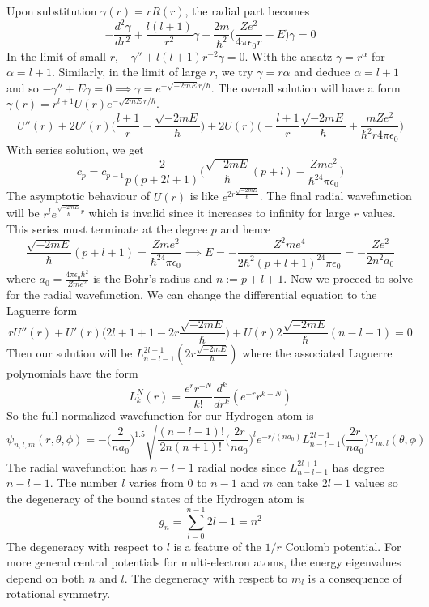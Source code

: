 \documentclass[a4paper]{article}
\begin{document}
\begin{eg}
Upon substitution $\gamma(r)=rR(r)$, the radial part becomes
$$-\frac{d^2\gamma}{dr^2}+\frac{l(l+1)}{r^2}\gamma+\frac{2m}{\hbar^2}\bigg(\frac{Ze^2}{4\pi\epsilon_0r}-E\bigg)\gamma=0$$
In the limit of small $r$, $-\gamma''+l(l+1)r^{-2}\gamma=0$. With the ansatz $\gamma=r^\alpha$ for $\alpha=l+1$. Similarly, in the limit of large $r$, we try $\gamma=r\alpha$ and deduce $\alpha=l+1$ and so $-\gamma''+E\gamma=0\implies\gamma=e^{-\sqrt{-2mE}r/\hbar}$. The overall solution will have a form $\gamma(r)=r^{l+1}U(r)e^{-\sqrt{2mE}r/\hbar}$. 
$$U''(r)+2U'(r)\bigg(\frac{l+1}{r}-\frac{\sqrt{-2mE}}{\hbar}\bigg)+2U(r)\bigg(-\frac{l+1}{r}\frac{\sqrt{-2mE}}{\hbar}+\frac{mZe^2}{\hbar^2r4\pi\epsilon_0}\bigg)$$
With series solution, we get
$$c_p=c_{p-1}\frac{2}{p(p+2l+1)}\bigg(\frac{\sqrt{-2mE}}{\hbar}(p+l)-\frac{Zme^2}{\hbar^24\pi\epsilon_0}\bigg)$$
The asymptotic behaviour of $U(r)$ is like $e^{2r\frac{\sqrt{-2mE}}{\hbar}}$. The final radial wavefunction will be $r^le^{\frac{\sqrt{-2mE}}{\hbar}r}$ which is invalid since it increases to infinity for large $r$ values. This series must terminate at the degree $p$ and hence $$\frac{\sqrt{-2mE}}{\hbar}(p+l+1)=\frac{Zme^2}{\hbar^24\pi\epsilon_0}\implies E=-\frac{Z^2me^4}{2\hbar^2(p+l+1)^24\pi\epsilon_0}=-\frac{Ze^2}{2n^2a_0}$$
where $a_0=\frac{4\pi\epsilon_0\hbar^2}{Zme^2}$ is the Bohr's radius and $n:=p+l+1$.
Now we proceed to solve for the radial wavefunction. We can change the differential equation to the Laguerre form
$$rU''(r)+U'(r)\bigg(2l+1+1-2r\frac{\sqrt{-2mE}}{\hbar}\bigg)+U(r)2\frac{\sqrt{-2mE}}{\hbar}(n-l-1)=0$$ Then our solution will be $L_{n-l-1}^{2l+1}(2r\frac{\sqrt{-2mE}}{\hbar})$ where the associated Laguerre polynomials have the form
$$L_k^N(r)=\frac{e^rr^{-N}}{k!}\frac{d^k}{dr^k}(e^{-r}r^{k+N})$$
So the full normalized wavefunction for our Hydrogen atom is
$$\psi_{n,l,m}(r,\theta,\phi)
=-\bigg(\frac{2}{na_0}\bigg)^{1.5}\sqrt{\frac{(n-l-1)!}{2n(n+1)!}}\bigg(\frac{2r}{na_0}\bigg)^le^{-r/(na_0)}L_{n-l-1}^{2l+1}\bigg(\frac{2r}{na_0}\bigg)Y_{m,l}(\theta,\phi)$$
The radial wavefunction has $n-l-1$ radial nodes since $L_{n-l-1}^{2l+1}$ has degree $n-l-1$. The number $l$ varies from 0 to $n-1$ and $m$ can take $2l+1$ values so the degeneracy of the bound states of the Hydrogen atom is
$$g_n=\sum_{l=0}^{n-1}2l+1=n^2$$
The degeneracy with respect to $l$ is a feature of the $1/r$ Coulomb potential. For more general central potentials for multi-electron atoms, the energy eigenvalues depend on both $n$ and $l$. The degeneracy with respect to $m_l$ is a consequence of rotational symmetry.
\end{eg}
\end{document}
